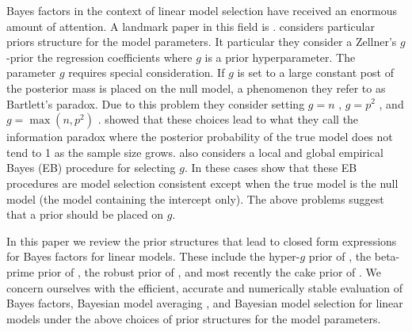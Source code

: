 Bayes factors in the context of linear model selection 
\citep{Zellner1980,
	Zellner1980b,
	Mitchell1988,
	George1993,
	Fernandez2001,
	Liang2008,
	Maruyama2011,
	Bayarri2012}
have received an 
enormous amount of attention. A landmark paper in this field is \cite{Liang2008}.
\cite{Liang2008} considers particular priors structure for the model parameters. 
It particular they consider a Zellner's $g$-prior \cite{Zellner1980,Zellner1986} 
the regression coefficients where $g$ is a prior hyperparameter. The parameter $g$
requires special consideration. If $g$ is set to a large constant post of the posterior
mass is placed on the null model, a phenomenon they refer to as Bartlett's paradox.
Due to this problem they consider setting $g=n$ \citep{Kass1995b},  $g=p^2$ \cite{Foster1994},
and $g=\max(n,p^2)$ \citep{Fernandez2001}. \cite{Liang2008} showed that these choices
lead to what they call the information paradox where the posterior probability of the
true model does not tend to 1 as the sample size grows. \cite{Liang2008} also considers
a local and global empirical Bayes (EB) procedure for selecting $g$. In these cases \cite{Liang2008}
show that these EB procedures are model selection consistent except when the true model is the null
model (the model containing the intercept only). The above problems suggest that a prior should
be placed on $g$.

In this paper we review the prior structures that lead to closed form expressions for Bayes factors for linear models.
These include the hyper-$g$ prior of \cite{Liang2008}, the beta-prime prior of \cite{Maruyama2011}, the robust 
prior of \cite{Bayarri2012}, and most recently the cake prior of \cite{OrmerodEtal2017}. We concern ourselves with the efficient, accurate and numerically stable evaluation of Bayes factors, Bayesian model averaging ,
and Bayesian model selection  for linear models 
under the above choices of prior structures for the model parameters.


